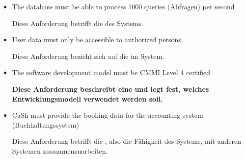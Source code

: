 \begin{defBox}[title=Example (CaSh non-functional requirements)]
    \begin{itemize}
        \item The database must be able to process 1000 queries (Abfragen) per second
        \begin{infoBox}
            Diese Anforderung betrifft die  des Systems.
        \end{infoBox}
        \item User data must only be accessible to authorized persons
        \begin{infoBox}
            Diese Anforderung bezieht sich auf die  im System.
        \end{infoBox}
        \item The software development model must be CMMI Level 4 certified
        \begin{infoBox}
            \textbf{Diese Anforderung beschreibt eine  und legt fest, welches Entwicklungsmodell verwendet werden soll.}
        \end{infoBox}
        \item CaSh must provide the booking data for the accounting system (Buchhaltungssystem)
        \begin{infoBox}
            Diese Anforderung betrifft die , also die Fähigkeit des Systems, mit anderen Systemen zusammenzuarbeiten.
        \end{infoBox}
    \end{itemize}
\end{defBox}

